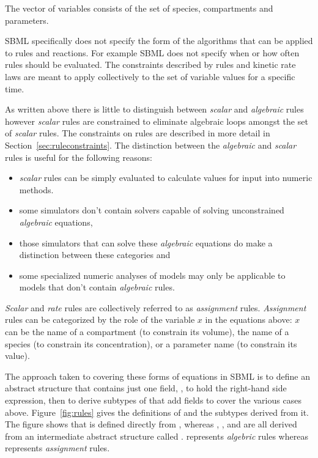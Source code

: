 \documentclass[10pt]{cekarticle}
\newcommand{\vref}[1]{\ref{#1}}
\begin{document}
The vector of variables consists of the set of species,
compartments and parameters.  

SBML specifically does not specify the form of the algorithms that can be applied to rules and reactions.  For example SBML does not specify when or how often rules should be evaluated.  The constraints described by rules and kinetic rate laws are meant to apply collectively to the set of variable values for a specific time.

As written above there is little to distinguish between \emph{scalar} and \emph{algebraic} rules however \emph{scalar} rules are constrained to eliminate algebraic loops amongst the set of \emph{scalar} rules. The constraints on rules are described in more detail in Section~\ref{sec:ruleconstraints}. The distinction between the 
\emph{algebraic} and \emph{scalar} rules is useful for the following reasons:
\begin{itemize}
\item \emph{scalar} rules can be simply evaluated to calculate values for input into numeric methods.
\item some simulators don't contain solvers capable of solving unconstrained \emph{algebraic} equations,
\item those simulators that can solve these \emph{algebraic} equations do make
a distinction between these categories and
\item some specialized numeric analyses of models may only be applicable to models that don't contain \emph{algebraic} rules.
\end{itemize}

\emph{Scalar} and \emph{rate} rules are collectively referred to as \emph{assignment} rules.  \emph{Assignment} rules can be categorized by the role of the variable $x$ in the
equations above: $x$ can be the name of a compartment (to
constrain its volume), the name of a species (to constrain its
concentration), or a parameter name (to constrain its value).

The approach taken to covering these forms of equations in SBML is to define an
abstract  structure that contains just one field,
, to hold the right-hand side expression, then to
derive subtypes of  that add fields to cover the
various cases above. Figure~\vref{fig:rules} gives the definitions
of  and the subtypes derived from it.  The figure
shows that  is defined directly from
, whereas ,
, and  are
all derived from an intermediate abstract structure called
.   represents \emph{algebric} rules whereas  represents \emph{assignment} rules.
\end{document}
